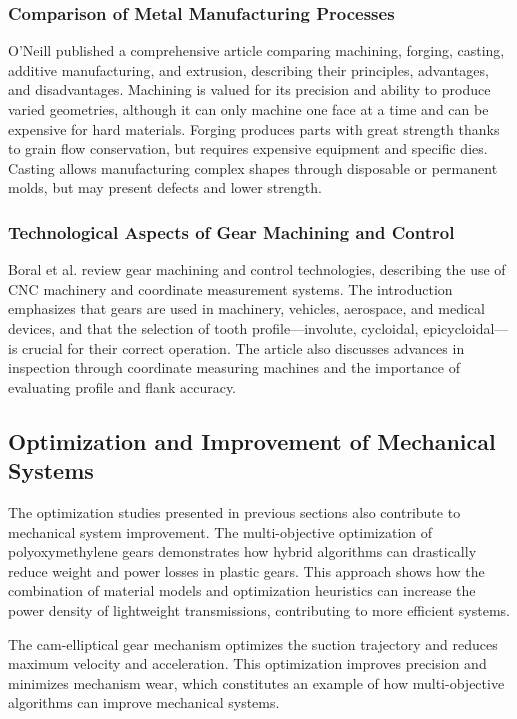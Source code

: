 \documentclass{article}
\begin{document}
\subsubsection*{Comparison of Metal Manufacturing Processes}
O'Neill \cite{oneill2023metal} published a comprehensive article comparing machining, forging, casting, additive manufacturing, and extrusion, describing their principles, advantages, and disadvantages.
Machining is valued for its precision and ability to produce varied geometries, although it can only machine one face at a time and can be expensive for hard materials.
Forging produces parts with great strength thanks to grain flow conservation, but requires expensive equipment and specific dies.
Casting allows manufacturing complex shapes through disposable or permanent molds, but may present defects and lower strength.

\subsubsection*{Technological Aspects of Gear Machining and Control}
Boral et al. \cite{boral2023technological} review gear machining and control technologies, describing the use of CNC machinery and coordinate measurement systems.
The introduction emphasizes that gears are used in machinery, vehicles, aerospace, and medical devices, and that the selection of tooth profile—involute, cycloidal, epicycloidal—is crucial for their correct operation.
The article also discusses advances in inspection through coordinate measuring machines and the importance of evaluating profile and flank accuracy.

\subsection*{Optimization and Improvement of Mechanical Systems}

The optimization studies presented in previous sections also contribute to mechanical system improvement.
The multi-objective optimization of polyoxymethylene gears \cite{elsiedy2024multi} demonstrates how hybrid algorithms can drastically reduce weight and power losses in plastic gears.
This approach shows how the combination of material models and optimization heuristics can increase the power density of lightweight transmissions, contributing to more efficient systems.

The cam-elliptical gear mechanism \cite{zhang2024cam} optimizes the suction trajectory and reduces maximum velocity and acceleration.
This optimization improves precision and minimizes mechanism wear, which constitutes an example of how multi-objective algorithms can improve mechanical systems.
\end{document}
